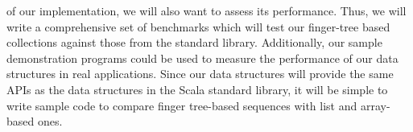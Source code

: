 \documentclass[a4paper,nobib]{tufte-handout}
\begin{document}
 of our implementation, we will also want to assess its performance. Thus, we will write a comprehensive set of benchmarks which will test our finger-tree based collections against those from the standard library. Additionally, our sample demonstration programs could be used to measure the performance of our data structures in real applications. Since our data structures will provide the same APIs as the data structures in the Scala standard library, it will be simple to write sample code to compare finger tree-based sequences with list and array-based ones.




\end{document}
